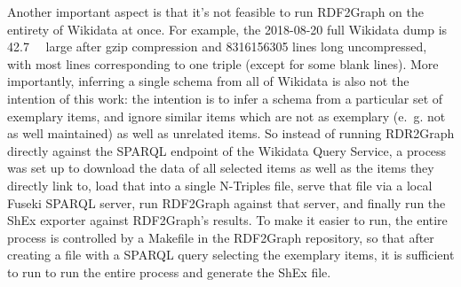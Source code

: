 Another important aspect is that it’s not feasible to run RDF2Graph on the entirety of Wikidata at once.
For example, the 2018-08-20 full Wikidata dump is \SI{42.7}{\giga\byte} large after gzip compression %
and \num{8316156305} lines long uncompressed,
with most lines corresponding to one triple (except for some blank lines).
More importantly, inferring a single schema from all of Wikidata is also not the intention of this work:
the intention is to infer a schema from a particular set of exemplary items, %
and ignore similar items which are not as exemplary (e.~g. not as well maintained)
as well as unrelated items. %
So instead of running RDR2Graph directly against the SPARQL endpoint of the Wikidata Query Service,
a process was set up %
to download the data of all selected items as well as the items they directly link to,
load that into a single N-Triples file,
serve that file via a local Fuseki SPARQL server,
run RDF2Graph against that server,
and finally run the ShEx exporter against RDF2Graph’s results.
To make it easier to run, the entire process is controlled by a Makefile in the RDF2Graph repository,
so that after creating a  file with a SPARQL query selecting the exemplary items,
it is sufficient to run  to run the entire process and generate the ShEx file.

